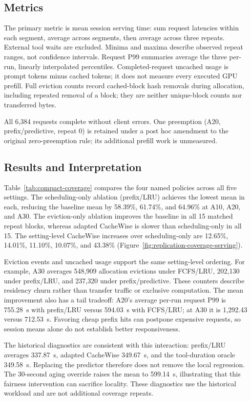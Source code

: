 \subsection{Metrics}
The primary metric is mean session serving time: sum request latencies within each segment, average across segments, then average across three repeats.
External tool waits are excluded.
Minima and maxima describe observed repeat ranges, not confidence intervals.
Request P99 summaries average the three per-run, linearly interpolated percentiles.
Completed-request uncached usage is prompt tokens minus cached tokens; it does not measure every executed GPU prefill.
Full eviction counts record cached-block hash removals during allocation, including repeated removal of a block; they are neither unique-block counts nor transferred bytes.

All 6,384 requests complete without client errors.
One preemption (A20, prefix/predictive, repeat 0) is retained under a post hoc amendment to the original zero-preemption rule; its additional prefill work is unmeasured.




\subsection{Results and Interpretation}
Table~\ref{tab:compact-coverage} compares the four named policies across all five settings.
The scheduling-only ablation (prefix/LRU) achieves the lowest mean in each, reducing the baseline mean by 58.39\%, 61.74\%, and 64.96\% at A10, A20, and A30.
The eviction-only ablation improves the baseline in all 15 matched repeat blocks, whereas adapted CacheWise is slower than scheduling-only in all 15.
The setting-level CacheWise increases over scheduling-only are 12.65\%, 14.01\%, 11.10\%, 10.07\%, and 43.38\% (Figure~\ref{fig:replication-coverage-serving}).

Eviction events and uncached usage support the same setting-level ordering.
For example, A30 averages 548,909 allocation evictions under FCFS/LRU, 202,130 under prefix/LRU, and 237,320 under prefix/predictive.
These counters describe residency churn rather than transfer traffic or exclusive computation.
The mean improvement also has a tail tradeoff: A20's average per-run request P99 is 755.28~s with prefix/LRU versus 594.03~s with FCFS/LRU; at A30 it is 1,292.43 versus 712.53~s.
Favoring cheap prefix hits can postpone expensive requests, so session means alone do not establish better responsiveness.

The historical diagnostics are consistent with this interaction: prefix/LRU averages 337.87~s, adapted CacheWise 349.67~s, and the tool-duration oracle 349.58~s.
Replacing the predictor therefore does not remove the local regression.
The 30-second aging override raises the mean to 599.14~s, illustrating that this fairness intervention can sacrifice locality.
These diagnostics use the historical workload and are not additional coverage repeats.
